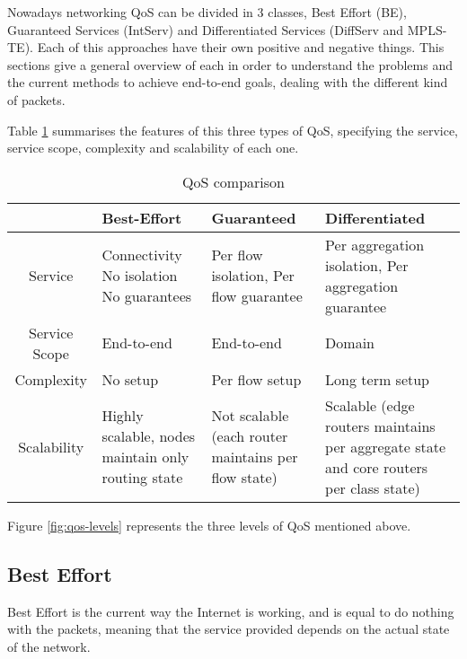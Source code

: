 Nowadays networking QoS can be divided in 3 classes, Best Effort (BE), Guaranteed Services (IntServ) and Differentiated Services (DiffServ and MPLS-TE). Each of this approaches have their own positive and negative things. This sections give a general overview of each in order to understand the problems and the current methods to achieve end-to-end goals, dealing with the different kind of packets.

Table \ref{table:qosComp} summarises the features of this three types of QoS, specifying the service, service scope, complexity and scalability of each one.

\begin{table}[ht] 
\caption{QoS comparison} %
\centering %
\begin{tabular}{c || p{2.5cm} p{3.5cm} p{4.5cm}} %
\hline\hline %
  & Best-Effort & Guaranteed & Differentiated \\ [0.5ex] %
\hline %
Service & Connectivity No isolation  No guarantees & Per flow isolation, Per flow guarantee & Per aggregation isolation, Per aggregation guarantee \\   \hline %
Service Scope & End-to-end & End-to-end & Domain \\   \hline
Complexity & No setup & Per flow setup & Long term setup \\   \hline
Scalability & Highly scalable, nodes maintain only routing state & Not scalable (each router maintains per flow state) & Scalable (edge routers maintains per aggregate state and core routers per class state) \\ [1ex] %
\hline %
\end{tabular} 
\label{table:qosComp} %
\end{table}

Figure \ref{fig:qos-levels} represents the three levels of QoS mentioned above.


\subsection{Best Effort}
\label{sec:be}

Best Effort is the current way the Internet is working, and is equal to do nothing with the packets, meaning that the service provided depends on the actual state of the network.


